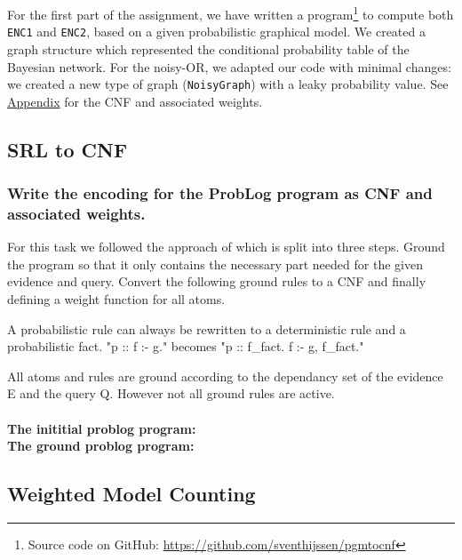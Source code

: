 \documentclass{article}
\begin{document}
For the first part of the assignment, we have written a program\footnote{Source code on GitHub: \href{https://github.com/sventhijssen/pgmtocnf}{https://github.com/sventhijssen/pgmtocnf}} to compute both \texttt{ENC1} and \texttt{ENC2}, based on a given probabilistic graphical model. We created a graph structure which represented the conditional probability table of the Bayesian network. For the noisy-OR, we adapted our code with minimal changes: we created a new type of graph (\texttt{NoisyGraph}) with a leaky probability value. See \hyperref[appendix]{Appendix} for the CNF and associated weights.

\newpage
 
\subsection{SRL to CNF}
\subsubsection{Write the encoding for the ProbLog program as CNF and associated weights.}
For this task we followed the approach of \cite{Fierens} which is split into three steps. Ground the program so that it only contains the necessary part needed for the given evidence and query. Convert the following ground rules to a CNF and finally defining a weight function for all atoms.

A probabilistic rule can always be rewritten to a deterministic rule and a probabilistic fact. "p :: f :- g." becomes "p :: f\_fact. f :- g, f\_fact."

All atoms and rules are ground according to the dependancy set of the evidence E and the query Q. However not all ground rules are active.
\\\\
\textbf{The inititial problog program:}
\\

\textbf{The ground problog program:}
\\


\newpage

\subsection{Weighted Model Counting}
\end{document}
